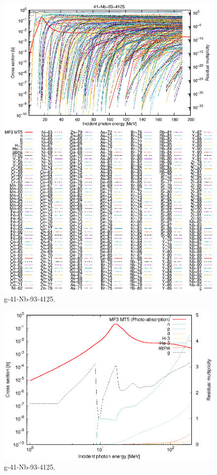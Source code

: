 \begin{figure}
 \includegraphics[width=\linewidth]{eps/g_41-Nb-93_4125.eps}
  \caption{g-41-Nb-93-4125.}
\end{figure}
\newpage \clearpage

\begin{figure}
 \includegraphics[width=\linewidth]{eps-log/g_41-Nb-93_4125.eps}
 \caption{g-41-Nb-93-4125.}
\end{figure}
\newpage \clearpage

